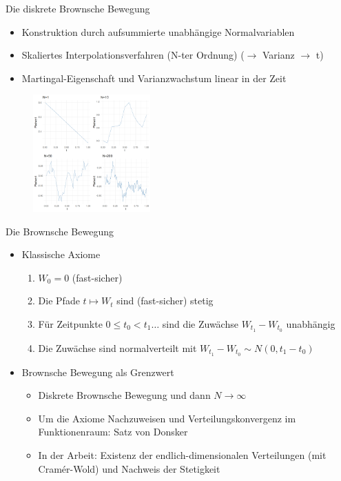\documentclass{beamer}
\begin{document}
\begin{frame}{Die diskrete Brownsche Bewegung}
  \begin{itemize}
    \item Konstruktion durch aufsummierte unabhängige Normalvariablen
    \item Skaliertes Interpolationsverfahren (N-ter Ordnung) ($\rightarrow$ Varianz $\to$ t)
    \item Martingal-Eigenschaft und Varianzwachstum linear in der Zeit
  \end{itemize}
  \begin{figure}
    \centering
  \includegraphics[width=0.4\textwidth]{../thesis/images/disrete_bb.png}
  \end{figure}
\end{frame}

\begin{frame}{Die Brownsche Bewegung}
  \begin{itemize}
  \item Klassische Axiome
    \begin{enumerate}
      \item $W_0=0$ (fast-sicher)
      \item Die Pfade $t \mapsto W_t$ sind (fast-sicher) stetig
      \item Für Zeitpunkte $0 \le t_0 < t_1 \dots$ sind die Zuwächse $W_{t_1} - W_{t_0}$ unabhängig
      \item Die Zuwächse sind normalverteilt mit $W_{t_1} - W_{t_0} \sim N(0, t_1 - t_0)$
    \end{enumerate}
  \pause
  \item Brownsche Bewegung als Grenzwert
    \begin{itemize}
      \item Diskrete Brownsche Bewegung und dann $N \to \infty$
      \item Um die Axiome Nachzuweisen und Verteilungskonvergenz im Funktionenraum: Satz von Donsker
      \item In der Arbeit: Existenz der endlich-dimensionalen Verteilungen (mit Cramér-Wold) und Nachweis der Stetigkeit
    \end{itemize}
\end{itemize}
\end{frame}
\end{document}
